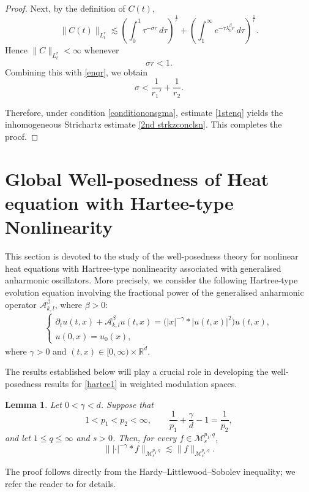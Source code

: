 \documentclass[12pt,reqno,a4paper]{amsart}
\numberwithin{equation}{section}
\theoremstyle{plain}
\newtheorem{lemma}[theorem]{Lemma}
\theoremstyle{definition}
\theoremstyle{remark}
\def\M{\mathcal{M}}
\def \Ad{\mathcal{A}_{k,l}}
\def \M{{\mathcal M}}
\begin{document}
\begin{proof}
Next, by the definition of \(C(t)\),
\[
\|C(t)\|_{L^{r}_{t}}
\lesssim
\left(
\int_{0}^{1}
\tau^{-\sigma r}\,d\tau
\right)^{\frac1r}
+
\left(
\int_{1}^{\infty}
e^{-\tau\lambda_{0}^{\beta}r}\,d\tau
\right)^{\frac1r}.
\]
Hence \(\|C\|_{L^{r}_{t}}<\infty\) whenever
\[
\sigma r<1.
\]
Combining this with \eqref{enqr}, we obtain
\begin{equation}
\label{conditiononsgma}
\sigma<
\frac{1}{r_{1}'}
+
\frac{1}{r_{2}}.
\end{equation}

Therefore, under condition \eqref{conditiononsgma}, estimate \eqref{1stenq} yields the inhomogeneous Strichartz estimate \eqref{2nd strkzconclsn}. This completes the proof.
\end{proof}

\section{Global Well-posedness of Heat equation with Hartee-type Nonlinearity}
This section is devoted to the study of the well-posedness theory for nonlinear heat equations with Hartree-type nonlinearity associated with generalised anharmonic oscillators. More precisely, we consider the following Hartree-type evolution equation involving the fractional power of the generalised anharmonic operator \(\Ad^{\beta}\), where \(\beta>0\):
\begin{align}
\label{hartee1}
\begin{cases}
\partial_{t}u(t,x)+\Ad^{\beta}u(t,x)
=
\bigl(|x|^{-\gamma}*|u(t,x)|^{2}\bigr)u(t,x),\\
u(0,x)=u_{0}(x),
\end{cases}
\end{align}
where \(\gamma>0\) and \((t,x)\in [0,\infty)\times\mathbb{R}^{d}\).

The results established below will play a crucial role in developing the well-posedness results for \eqref{hartee1} in weighted modulation spaces.
\begin{lemma}
\label{gamaplemma}
Let \(0<\gamma<d\). Suppose that
\[
1<p_{1}<p_{2}<\infty,
\qquad
\frac{1}{p_{1}}+\frac{\gamma}{d}-1=\frac{1}{p_{2}},
\]
and let \(1\leq q\leq\infty\) and \(s>0\). Then, for every \(f\in\M^{p_{1},q}_{s}\),
\[
\||\cdot|^{-\gamma}*f\|_{\M^{p_{2},q}_{s}}
\lesssim
\|f\|_{\M^{p_{1},q}_{s}}.
\]
\end{lemma}

The proof follows directly from the Hardy--Littlewood--Sobolev inequality; we refer the reader to \cite{MR4134386} for details.
\end{document}
